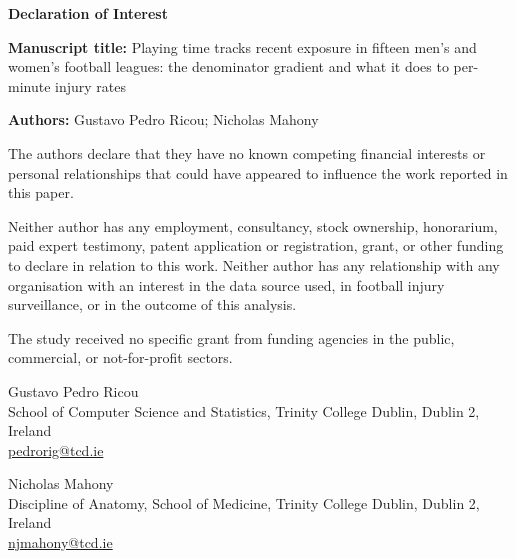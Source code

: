 \documentclass[11pt]{article}
\begin{document}
{\large\bfseries Declaration of Interest\par}

\vspace{0.5em}

\textbf{Manuscript title:} Playing time tracks recent exposure in fifteen
men's and women's football leagues: the denominator gradient and what it
does to per-minute injury rates

\textbf{Authors:} Gustavo Pedro Ricou; Nicholas Mahony

\vspace{0.5em}

The authors declare that they have no known competing financial interests or
personal relationships that could have appeared to influence the work reported
in this paper.

Neither author has any employment, consultancy, stock ownership, honorarium,
paid expert testimony, patent application or registration, grant, or other
funding to declare in relation to this work. Neither author has any
relationship with any organisation with an interest in the data source used,
in football injury surveillance, or in the outcome of this analysis.

The study received no specific grant from funding agencies in the public,
commercial, or not-for-profit sectors.

\vspace{1em}

Gustavo Pedro Ricou\\
School of Computer Science and Statistics, Trinity College Dublin, Dublin 2,
Ireland\\
\href{mailto:pedrorig@tcd.ie}{pedrorig@tcd.ie}

\vspace{0.5em}

Nicholas Mahony\\
Discipline of Anatomy, School of Medicine, Trinity College Dublin, Dublin 2,
Ireland\\
\href{mailto:njmahony@tcd.ie}{njmahony@tcd.ie}
\end{document}
